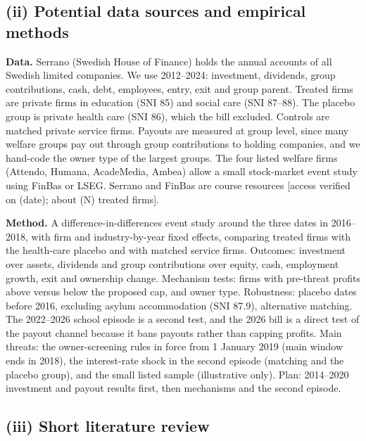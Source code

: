 \documentclass[12pt,a4paper]{article}
\begin{document}
\subsection{(ii) Potential data sources and empirical methods}

\textbf{Data.} Serrano (Swedish House of Finance) holds the annual accounts of all Swedish limited companies. We use 2012--2024: investment, dividends, group contributions, cash, debt, employees, entry, exit and group parent. Treated firms are private firms in education (SNI 85) and social care (SNI 87--88). The placebo group is private health care (SNI 86), which the bill excluded. Controls are matched private service firms. Payouts are measured at group level, since many welfare groups pay out through group contributions to holding companies, and we hand-code the owner type of the largest groups. The four listed welfare firms (Attendo, Humana, AcadeMedia, Ambea) allow a small stock-market event study using FinBas or LSEG. Serrano and FinBas are course resources [access verified on (date); about (N) treated firms].

\textbf{Method.} A difference-in-differences event study around the three dates in 2016--2018, with firm and industry-by-year fixed effects, comparing treated firms with the health-care placebo and with matched service firms. Outcomes: investment over assets, dividends and group contributions over equity, cash, employment growth, exit and ownership change. Mechanism tests: firms with pre-threat profits above versus below the proposed cap, and owner type. Robustness: placebo dates before 2016, excluding asylum accommodation (SNI 87.9), alternative matching. The 2022--2026 school episode is a second test, and the 2026 bill is a direct test of the payout channel because it bans payouts rather than capping profits. Main threats: the owner-screening rules in force from 1 January 2019 (main window ends in 2018), the interest-rate shock in the second episode (matching and the placebo group), and the small listed sample (illustrative only). Plan: 2014--2020 investment and payout results first, then mechanisms and the second episode.

\subsection{(iii) Short literature review}
\end{document}
